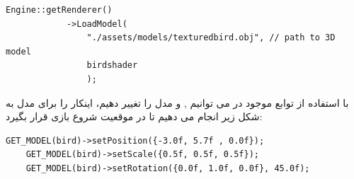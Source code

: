 \documentclass[a4paper, 12pt]{book}
\newcommand{\lrit}[1]{\lr{\textit{#1}}}
\begin{document}
\begin{LTR}
    \small
        \begin{lstlisting}[style=C++Style,caption=\lrit{loading a 3D model}]
Engine::getRenderer()
            ->LoadModel(
                "./assets/models/texturedbird.obj", // path to 3D model
                birdshader
                );
        \end{lstlisting}
    \end{LTR}
    \normalsize
    \vspace*{0.3cm}

    با استفاده از توابع موجود در  می توانیم ,  و   مدل را تغییر دهیم، اینکار را برای مدل  به شکل زیر انجام می دهیم تا در موقعیت شروع بازی قرار بگیرد:

    \begin{LTR}
    \small
        \begin{lstlisting}[style=C++Style,caption=\lrit{position, scale, rotation}]
    GET_MODEL(bird)->setPosition({-3.0f, 5.7f , 0.0f});
    GET_MODEL(bird)->setScale({0.5f, 0.5f, 0.5f});
    GET_MODEL(bird)->setRotation({0.0f, 1.0f, 0.0f}, 45.0f);
        \end{lstlisting}
    \end{LTR}
    \normalsize
    \vspace*{0.3cm}
\end{document}

